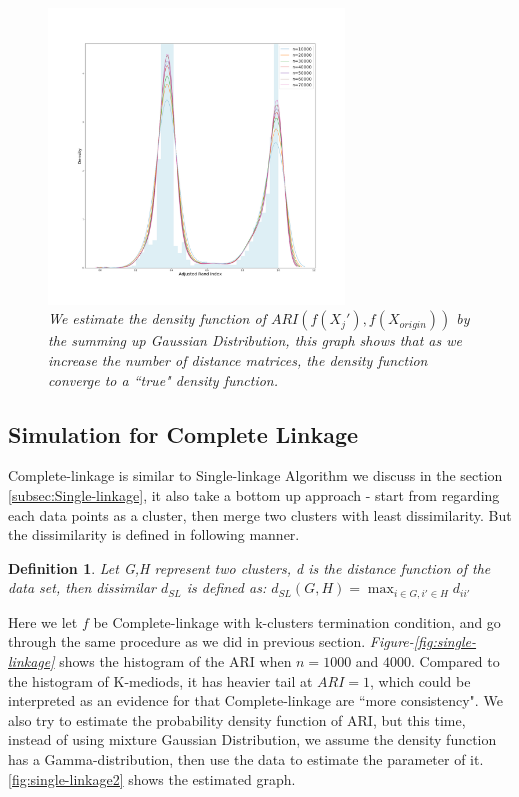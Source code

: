 \documentclass{uonmathreport}
\newtheorem{definition}{Definition}[section]
\begin{document}
\begin{figure}[H]
 \begin{center}
   \includegraphics[width=0.7\textwidth]{simulate2.png}
 \end{center}
 \caption{\textit{We estimate the density function of $ARI(f(X_j'),f(X_{origin}))$ by the summing up Gaussian Distribution, this graph shows that as we increase the number of distance matrices, the density function converge to a ``true" density function.}}
 \label{fig:bsd}
\end{figure}

\subsection{Simulation for Complete Linkage} \label{subsec: Complete-linkage}
Complete-linkage is similar to Single-linkage Algorithm we discuss in the section \ref{subsec:Single-linkage}, it also take a bottom up approach - start from regarding each data points as a cluster, then merge two clusters with least dissimilarity\cite{christopher2008introduction}. But the dissimilarity is defined in following manner.
\begin{definition}
Let G,H represent two clusters, d is the distance function of the data set, then dissimilar $d_{SL}$ is defined as:
$d_{SL}(G,H) = \max_{i\in G,i'\in H}d_{ii'} $
\end{definition}
Here we let $f$ be Complete-linkage with k-clusters termination condition, and go through the same procedure as we did in previous section. \textit{Figure-\ref{fig:single-linkage}} shows the histogram of the ARI when $n=1000$ and $4000$. Compared to the histogram of K-mediods, it has heavier tail at $ARI = 1$, which could be interpreted as an evidence for that Complete-linkage are ``more consistency".  We also try to estimate the probability density function of ARI, but this time, instead of using mixture Gaussian Distribution, we assume the density function has a Gamma-distribution, then use the data to estimate the parameter of it. \ref{fig:single-linkage2} shows the estimated graph.
\end{document}
